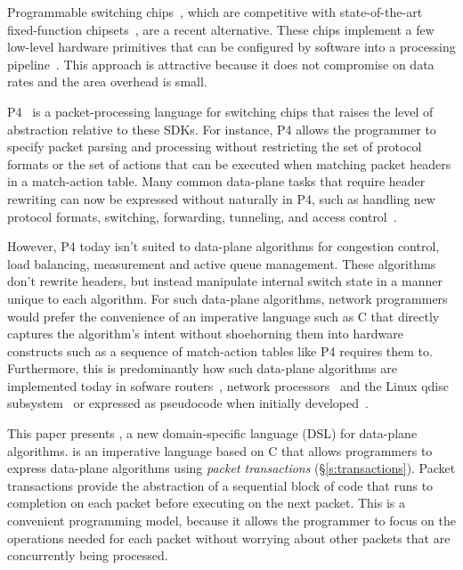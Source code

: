 Programmable switching chips~\cite{flexpipe, xpliant, rmt}, which are
competitive with state-of-the-art fixed-function
chipsets~\cite{trident, tomahawk, mellanox}, are a recent alternative.
These chips implement a few low-level hardware primitives that can be
configured by software into a processing
pipeline~\cite{xpliant_sdk,xpliant_sdk2,intel_sdk,rmt, P4}. This
approach is attractive because it does not compromise on data rates
and the area overhead is small.


P4~\cite{p4, p4spec} is a packet-processing language for switching
chips that raises the level of abstraction relative to these SDKs.
For instance, P4 allows the programmer to specify packet parsing and
processing without restricting the set of protocol formats or the set
of actions that can be executed when matching packet headers in a
match-action table. Many common data-plane tasks that require header
rewriting can now be expressed without naturally in P4, such as
handling new protocol formats, switching, forwarding, tunneling, and
access control~\cite{dc_p4}.

However, P4 today isn't suited to data-plane algorithms for congestion control,
load balancing, measurement and active queue management. These algorithms don't
rewrite headers, but instead manipulate internal switch state in a manner
unique to each algorithm.  For such data-plane algorithms, network programmers
would prefer the convenience of an imperative language such as C that directly
captures the algorithm's intent without shoehorning them into hardware
constructs such as a sequence of match-action tables like P4 requires them to.
Furthermore, this is predominantly how such data-plane algorithms are
implemented today in sofware routers~\cite{click, dpdk, routebricks}, network
processors~\cite{packetc, nova} and the Linux qdisc subsystem~\cite{qdisc} or
expressed as pseudocode when initially developed~\cite{red, csfq, codel_code,
avq, blue}.

This paper presents \pktlanguage, a new domain-specific language (DSL) for
data-plane algorithms.  \pktlanguage is an imperative language based on C that
allows programmers to express data-plane algorithms using {\em packet
transactions} (\S\ref{s:transactions}).  Packet transactions provide the
abstraction of a sequential block of code that runs to completion on each
packet before executing on the next packet. This is a convenient programming
model, because it allows the programmer to focus on the operations needed for
each packet without worrying about other packets that are concurrently being processed.

